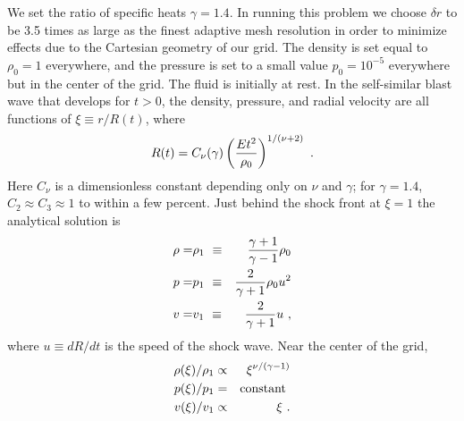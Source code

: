 We set the ratio of specific heats $\gamma=1.4$.
In running this problem we choose $\delta r$ to be 3.5
times as large as the finest adaptive mesh resolution in order to minimize
effects due to the Cartesian geometry of our grid.
The density
is set equal to $\rho_0=1$ everywhere, and the
pressure is set to a small value $p_0=10^{-5}$ everywhere but in the center
of the grid.
The fluid is initially at rest.
In the self-similar blast wave that develops for $t>0$, the
density, pressure, and radial velocity are all functions of
$\xi \equiv r/R(t)$, where
\begin{equation}
R(t) = C_\nu(\gamma) \left({Et^2\over \rho_0}\right)^{1/(\nu+2)}\ .
\end{equation}
\noindent Here $C_\nu$ is a
dimensionless constant depending only on $\nu$ and $\gamma$; for
$\gamma=1.4$, $C_2 \approx C_3 \approx 1$ to within a few percent.
Just behind the shock front at $\xi = 1$ the analytical solution is
\begin{eqnarray}
\nonumber
\rho = & \rho_1\,\, \equiv & {\gamma+1\over\gamma-1}\rho_0 \\
p    = & p_1\,\,    \equiv & {2\over\gamma+1}\rho_0 u^2 \\
\nonumber
v    = & v_1\,\,    \equiv & {2\over\gamma+1}u\ ,
\end{eqnarray}
\noindent where $u \equiv dR/dt$ is the speed of the shock wave. Near the
center of the grid,
\begin{eqnarray}
\nonumber
\rho(\xi)/\rho_1 & \propto & \xi^{\nu/(\gamma-1)} \\
p(\xi)/p_1       & =       & {\rm constant}\ \\
\nonumber
v(\xi)/v_1       & \propto & \xi \ .
\end{eqnarray}

